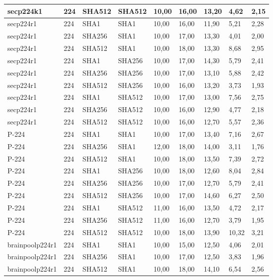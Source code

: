 \begin{longtable}{| l | l | l | l | l |l |l |l |l |}
secp224k1 & 224 & SHA512 & SHA512 & 10,00 & 16,00 & 13,20 & 4,62 & 2,15 \\ \hline 
secp224r1 & 224 & SHA1 & SHA1 & 10,00 & 16,00 & 11,90 & 5,21 & 2,28 \\ \hline 
secp224r1 & 224 & SHA256 & SHA1 & 10,00 & 17,00 & 13,30 & 4,01 & 2,00 \\ \hline 
secp224r1 & 224 & SHA512 & SHA1 & 10,00 & 18,00 & 13,30 & 8,68 & 2,95 \\ \hline 
secp224r1 & 224 & SHA1 & SHA256 & 10,00 & 17,00 & 14,30 & 5,79 & 2,41 \\ \hline 
secp224r1 & 224 & SHA256 & SHA256 & 10,00 & 17,00 & 13,10 & 5,88 & 2,42 \\ \hline 
secp224r1 & 224 & SHA512 & SHA256 & 10,00 & 16,00 & 13,20 & 3,73 & 1,93 \\ \hline 
secp224r1 & 224 & SHA1 & SHA512 & 10,00 & 17,00 & 13,00 & 7,56 & 2,75 \\ \hline 
secp224r1 & 224 & SHA256 & SHA512 & 10,00 & 16,00 & 12,90 & 4,77 & 2,18 \\ \hline 
secp224r1 & 224 & SHA512 & SHA512 & 10,00 & 16,00 & 12,70 & 5,57 & 2,36 \\ \hline 
P-224 & 224 & SHA1 & SHA1 & 10,00 & 17,00 & 13,40 & 7,16 & 2,67 \\ \hline 
P-224 & 224 & SHA256 & SHA1 & 12,00 & 18,00 & 14,00 & 3,11 & 1,76 \\ \hline 
P-224 & 224 & SHA512 & SHA1 & 10,00 & 18,00 & 13,50 & 7,39 & 2,72 \\ \hline 
P-224 & 224 & SHA1 & SHA256 & 10,00 & 18,00 & 12,60 & 8,04 & 2,84 \\ \hline 
P-224 & 224 & SHA256 & SHA256 & 10,00 & 17,00 & 12,70 & 5,79 & 2,41 \\ \hline 
P-224 & 224 & SHA512 & SHA256 & 10,00 & 17,00 & 14,60 & 6,27 & 2,50 \\ \hline 
P-224 & 224 & SHA1 & SHA512 & 11,00 & 16,00 & 13,50 & 4,72 & 2,17 \\ \hline 
P-224 & 224 & SHA256 & SHA512 & 11,00 & 16,00 & 12,70 & 3,79 & 1,95 \\ \hline 
P-224 & 224 & SHA512 & SHA512 & 10,00 & 18,00 & 13,90 & 10,32 & 3,21 \\ \hline 
brainpoolp224r1 & 224 & SHA1 & SHA1 & 10,00 & 15,00 & 12,50 & 4,06 & 2,01 \\ \hline 
brainpoolp224r1 & 224 & SHA256 & SHA1 & 10,00 & 17,00 & 12,50 & 3,83 & 1,96 \\ \hline 
brainpoolp224r1 & 224 & SHA512 & SHA1 & 10,00 & 18,00 & 14,10 & 6,54 & 2,56 \\ \hline 

\end{longtable}
